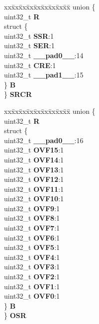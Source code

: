 \begin{DoxyCompactItemize}
\begin{tabbing}
\end{tabbing}\item 
\mbox{\label{structSIU__tag_a039573f43d2dc60d0817671e1512220b}} 
\begin{tabbing}
xx\=xx\=xx\=xx\=xx\=xx\=xx\=xx\=xx\=\kill
union \{\\
\>uint32\_t {\bfseries R}\\
\>struct \{\\
\>\>uint32\_t {\bfseries SSR}:1\\
\>\>uint32\_t {\bfseries SER}:1\\
\>\>uint32\_t {\bfseries \_\_pad0\_\_}:14\\
\>\>uint32\_t {\bfseries CRE}:1\\
\>\>uint32\_t {\bfseries \_\_pad1\_\_}:15\\
\>\} {\bfseries B}\\
\} {\bfseries SRCR}\\

\end{tabbing}\item 
\mbox{\label{structSIU__tag_ae46cdc0638d9689ee32106bb3ea9330a}} 
\begin{tabbing}
xx\=xx\=xx\=xx\=xx\=xx\=xx\=xx\=xx\=\kill
union \{\\
\>uint32\_t {\bfseries R}\\
\>struct \{\\
\>\>uint32\_t {\bfseries \_\_pad0\_\_}:16\\
\>\>uint32\_t {\bfseries OVF15}:1\\
\>\>uint32\_t {\bfseries OVF14}:1\\
\>\>uint32\_t {\bfseries OVF13}:1\\
\>\>uint32\_t {\bfseries OVF12}:1\\
\>\>uint32\_t {\bfseries OVF11}:1\\
\>\>uint32\_t {\bfseries OVF10}:1\\
\>\>uint32\_t {\bfseries OVF9}:1\\
\>\>uint32\_t {\bfseries OVF8}:1\\
\>\>uint32\_t {\bfseries OVF7}:1\\
\>\>uint32\_t {\bfseries OVF6}:1\\
\>\>uint32\_t {\bfseries OVF5}:1\\
\>\>uint32\_t {\bfseries OVF4}:1\\
\>\>uint32\_t {\bfseries OVF3}:1\\
\>\>uint32\_t {\bfseries OVF2}:1\\
\>\>uint32\_t {\bfseries OVF1}:1\\
\>\>uint32\_t {\bfseries OVF0}:1\\
\>\} {\bfseries B}\\
\} {\bfseries OSR}\\


\end{tabbing}
\end{DoxyCompactItemize}
